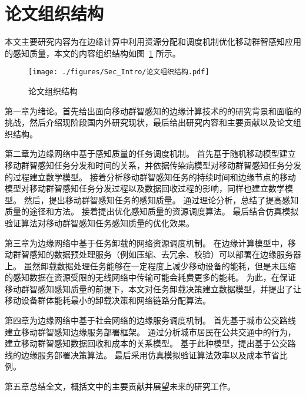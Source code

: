\section{论文组织结构}



本文主要研究内容为在边缘计算中利用资源分配和调度机制优化移动群智感知应用的感知质量，本文的内容组织结构如图~\ref{Figure_Re_Instruction} 所示。

\begin{figure}[!ht]
  \centering
  \texttt{[image: ./figures/Sec\_Intro/论文组织结构.pdf]}
  \caption{论文组织结构}
  \vspace{-1em}
  \label{Figure_Re_Instruction}
\end{figure}

第一章为绪论。首先给出面向移动群智感知的边缘计算技术的的研究背景和面临的挑战，然后介绍现阶段国内外研究现状，最后给出研究内容和主要贡献以及论文组织结构。


第二章为边缘网络中基于感知质量的任务调度机制。
首先基于随机移动模型建立移动群智感知任务分发和时间的关系，并依据传染病模型对移动群智感知任务分发的过程建立数学模型。
接着分析移动群智感知任务的持续时间和边缘节点的移动模型对移动群智感知任务分发过程以及数据回收过程的影响，同样也建立数学模型。
然后，提出移动群智感知任务的感知质量。
通过理论分析，总结了提高感知质量的途径和方法。
接着提出优化感知质量的资源调度算法。
最后结合仿真模拟验证算法对移动群智感知任务感知质量的优化效果。

第三章为边缘网络中基于任务卸载的网络资源调度机制。
在边缘计算模型中，移动群智感知的数据预处理服务（例如压缩、去冗余、校验）可以部署在边缘服务器上。
虽然卸载数据处理任务能够在一定程度上减少移动设备的能耗，但是未压缩的感知数据在资源受限的无线网络中传输可能会耗费更多的能耗。
为此，在保证移动群智感知感知质量的前提下，本文对任务卸载决策建立数据模型，并提出了让移动设备群体能耗最小的卸载决策和网络链路分配算法。

第四章为边缘网络中基于社会网络的边缘服务调度机制。
首先基于城市公交路线建立移动群智感知边缘服务部署框架。
通过分析城市居民在公共交通中的行为，建立移动群智感知数据回收和成本的关系模型。
基于此种模型，提出基于公交路线的边缘服务部署决策算法。
最后采用仿真模拟验证算法效率以及成本节省比例。

第五章总结全文，概括文中的主要贡献并展望未来的研究工作。
